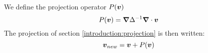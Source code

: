 \begin{definition}
We define the projection operator $P({\boldsymbol {v}})$
  \begin{equation}
    P({\boldsymbol {v}})={\boldsymbol {\nabla}}\Delta^{-1}{\boldsymbol {\nabla}}\cdot {\boldsymbol {v}}
  \end{equation}
  The projection of section \ref{introduction:projection} is then written:
  \begin{equation}
    {\boldsymbol {v}}_{new}={\boldsymbol {v}}+P({\boldsymbol {v}})
  \end{equation}

\end{definition}

